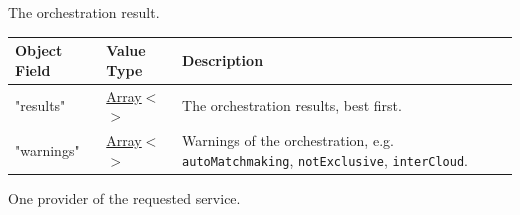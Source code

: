\documentclass[a4paper]{arrowhead}
\newcommand{\mref}[2][]{{\textcolor{ArrowheadPurple}{\hyperref[sec:model:#2]{\ifstrempty{#1}{#2}{#1}}}}}
\newcommand{\pref}[1]{{\textcolor{ArrowheadGrey}{\hyperref[sec:model:primitives:#1]{#1}}}}
\begin{document}
The orchestration result.


\noindent\begin{tabularx}{\textwidth}{| >{\raggedright\arraybackslash}p{3.9cm} | >{\raggedright\arraybackslash\small}p{5.3cm} | X |} \hline
\rowcolor{gray!33} Object Field & Value Type & Description \\ \hline
"results" & \pref{Array}$<$\allowbreak{}\mref{OrchestrationResult}$>$ & The orchestration results, best first. \\ \hline
"warnings" & \pref{Array}$<$\allowbreak{}\pref{String}$>$ & Warnings of the orchestration, e.g. \texttt{autoMatchmaking}, \texttt{notExclusive}, \texttt{interCloud}. \\ \hline
\end{tabularx}




One provider of the requested service.
\end{document}
